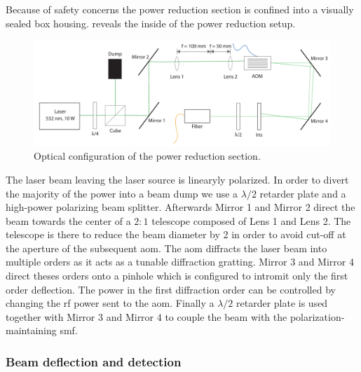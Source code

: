 Because of safety concerns the power reduction section is confined into a
visually sealed box housing.  reveals the
inside of the power reduction setup.
\begin{figure}[htb]
  \centering
  \includegraphics[width=\textwidth]{../figure/setup/power-reduction.pdf}
  \caption{Optical configuration of the power reduction section.
  }\label{fig:setup_power_reduction}
\end{figure}
The laser beam leaving the laser source is linearyly polarized. In order to
divert the majority of the power into a beam dump we use a $\lambda/2$
retarder plate and a high-power polarizing beam splitter. Afterwards Mirror
\num{1} and Mirror \num{2} direct the beam towards the center of a $2:1$
telescope composed of Lens \num{1} and Lens \num{2}. The telescope is there to
reduce the beam diameter by \num{2} in order to avoid cut-off at the aperture
of the subsequent \gls{aom}. The \gls{aom} diffracts the laser beam into
multiple orders as it acts as a tunable diffraction gratting. Mirror \num{3}
and Mirror \num{4} direct theses orders onto a pinhole which is configured to
intromit only the first order deflection. The power in the first diffraction
order can be controlled by changing the \gls{rf} power sent to the \gls{aom}.
Finally a $\lambda/2$ retarder plate is used together with Mirror \num{3} and
Mirror \num{4} to couple the beam with the polarization-maintaining \gls{smf}.

\subsubsection{Beam deflection and detection}\label{subsec:setup_deflection_detection}

